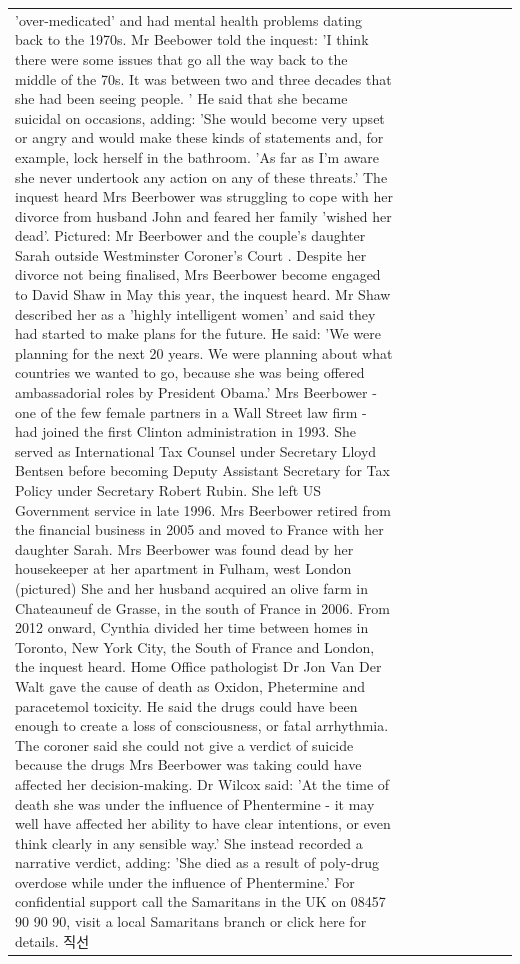 \begin{table}[H]
\begin{tabular}{lllrlllll}
'over-medicated' and had mental health problems dating back to the 1970s. Mr Beebower told the inquest: 'I think there were some issues that go all the way back to the middle of the 70s. It was between two and three decades that she had been seeing people. ' He said that she became suicidal on occasions, adding: 'She would become very upset or angry and would make these kinds of statements and, for example, lock herself in the bathroom. 'As far as I'm aware she never undertook any action on any of these threats.' The inquest heard Mrs Beerbower was struggling to cope with her divorce from husband John and feared her family 'wished her dead'. Pictured: Mr Beerbower and the couple's daughter Sarah outside Westminster Coroner's Court . Despite her divorce not being finalised, Mrs Beerbower become engaged to David Shaw in May this year, the inquest heard. Mr Shaw described her as a 'highly intelligent women' and said they had started to make plans for the future. He said: 'We were planning for the next 20 years. We were planning about what countries we wanted to go, because she was being offered ambassadorial roles by President Obama.' Mrs Beerbower - one of the few female partners in a Wall Street law firm - had joined the first Clinton administration in 1993. She served as International Tax Counsel under Secretary Lloyd Bentsen before becoming Deputy Assistant Secretary for Tax Policy under Secretary Robert Rubin. She left US Government service in late 1996. Mrs Beerbower retired from the financial business in 2005 and moved to France with her daughter Sarah. Mrs Beerbower was found dead by her housekeeper at her apartment in Fulham, west London (pictured) She and her husband acquired an olive farm in Chateauneuf de Grasse, in the south of France in 2006. From 2012 onward, Cynthia divided her time between homes in Toronto, New York City, the South of France and London, the inquest heard. Home Office pathologist Dr Jon Van Der Walt gave the cause of death as Oxidon, Phetermine and paracetemol toxicity. He said the drugs could have been enough to create a loss of consciousness, or fatal arrhythmia. The coroner said she could not give a verdict of suicide because the drugs Mrs Beerbower was taking could have affected her decision-making. Dr Wilcox said: 'At the time of death she was under the influence of Phentermine - it may well have affected her ability to have clear intentions, or even think clearly in any sensible way.' She instead recorded a narrative verdict, adding: 'She died as a result of poly-drug overdose while under the influence of Phentermine.' For confidential support call the Samaritans in the UK on 08457 90 90 90, visit a local Samaritans branch or click here for details. 직선 \\

\end{tabular}
\end{table}
